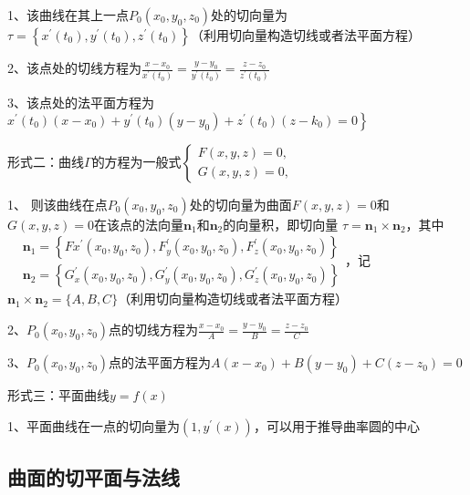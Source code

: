1、该曲线在其上一点$P_{0}\left(x_{0}, y_{0}, z_{0}\right)$处的切向量为$\tau=\left\{x^{\prime}\left(t_{0}\right), y^{\prime}\left(t_{0}\right), z^{\prime}\left(t_{0}\right)\right\}$（利用切向量构造切线或者法平面方程）

2、该点处的切线方程为$\frac{x-x_{0}}{x^{\prime}\left(t_{0}\right)}=\frac{y-y_{0}}{y^{\prime}\left(t_{0}\right)}=\frac{z-z_{0}}{z^{\prime}\left(t_{0}\right)}$

3、该点处的法平面方程为$\left.x^{\prime}\left(t_{0}\right)\left(x-x_{0}\right)+y^{\prime}\left(t_{0}\right)\left(y-y_{0}\right)+z^{\prime}\left(t_{0}\right)\left(z-k_{0}\right) = 0\right\}$

形式二：曲线$\Gamma$的方程为一般式$\left\{\begin{array}{l}F(x, y, z)=0,\\ G(x, y, z)=0,\end{array}\right.$

1、 则该曲线在点$P_{0}\left(x_{0}, y_{0}, z_{0}\right)$处的切向量为曲面$F(x, y, z)=0$和$G(x, y, z)=0$在该点的法向量$\boldsymbol{n}_{1}$和$\boldsymbol{n}_{2}$的向量积，即切向量 $\tau=\boldsymbol{n}_{1} \times \boldsymbol{n}_{2}$，其中$\begin{aligned} &\boldsymbol{n}_{1}=\left\{F{x}^{\prime}\left(x_{0}, y_{0}, z_{0}\right), F_{y}^{\prime}\left(x_{0}, y_{0}, z_{0}\right), F_{z}^{\prime}\left(x_{0}, y_{0}, z_{0}\right)\right\} \\ &\boldsymbol{n}_{2}=\left\{G_{x}^{\prime}\left(x_{0}, y_{0}, z_{0}\right), G_{y}^{\prime}\left(x_{0}, y_{0}, z_{0}\right), G_{z}^{\prime}\left(x_{0}, y_{0}, z_{0}\right)\right\} \end{aligned}$，记$\boldsymbol{n}_{1} \times \boldsymbol{n}_{2}=\{A, B, C\}$（利用切向量构造切线或者法平面方程）

2、$P_{0}\left(x_{0}, y_{0}, z_{0}\right)$点的切线方程为$\frac{x-x_{0}}{A}=\frac{y-y_{0}}{B}=\frac{z-z_{0}}{C}$

3、$P_{0}\left(x_{0}, y_{0}, z_{0}\right)$点的法平面方程为$A\left(x-x_{0}\right)+B\left(y-y_{0}\right)+C\left(z-z_{0}\right)=0$

形式三：平面曲线$y=f(x)$

1、平面曲线在一点的切向量为$(1,y^{\prime}(x))$，可以用于推导曲率圆的中心



\subsection{曲面的切平面与法线}

